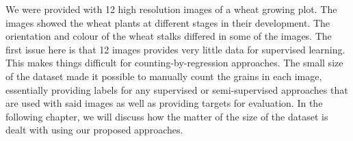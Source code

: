 We were provided with 12 high resolution images of a wheat growing plot. The images showed the wheat plants at different stages in their development. The orientation and colour of the wheat stalks differed in some of the images. The first issue here is that 12 images provides very little data for supervised learning. This makes things difficult for counting-by-regression approaches. The small size of the dataset made it possible to manually count the grains in each image, essentially providing labels for any supervised or semi-supervised approaches that are used with said images as well as providing targets for evaluation. In the following chapter, we will discuss how the matter of the size of the dataset is dealt with using our proposed approaches.







